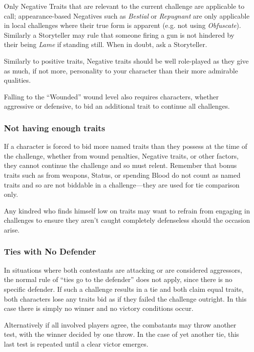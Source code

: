 Only Negative Traits that are relevant to the current challenge are applicable to call; appearance-based 
Negatives such as \emph{Bestial} or \emph{Repugnant} are only applicable in local challenges where their true 
form is apparent (e.g. not using \emph{Obfuscate}). Similarly a Storyteller may rule that someone firing a 
gun is not hindered by their being \emph{Lame} if standing still. When in doubt, ask a Storyteller.

Similarly to positive traits, Negative traits should be well role-played as they give as much, if not more, 
personality to your character than their more admirable qualities.

Falling to the ``Wounded'' wound level also requires characters, whether aggressive or defensive, to bid an 
additional trait to continue all challenges.

\subsubsection{Not having enough traits}
If a character is forced to bid more named traits than they possess at the time of the challenge, 
whether from wound penalties, Negative traits, or other factors, they cannot continue the 
challenge and so must relent.  Remember that bonus traits such as from weapons, Status, or spending 
Blood do not count as named traits and so are not biddable in a challenge---they are used for tie 
comparison only.

Any kindred who finds himself low on traits may want to refrain from engaging in challenges to ensure 
they aren't caught completely defenseless should the occasion arise.

\subsubsection{Ties with No Defender}
In situations where both contestants are attacking or are considered aggressors, the normal rule of 
``ties go to the defender'' does not apply, since there is no specific defender.  If such a challenge 
results in a tie and both claim equal traits, both characters lose any traits bid as if they failed the 
challenge outright.  In this case there is simply no winner and no victory conditions occur.

Alternatively if all involved players agree, the combatants may throw another test, with the winner 
decided by one throw.  In the case of yet another tie, this last test is repeated until a clear victor 
emerges.

